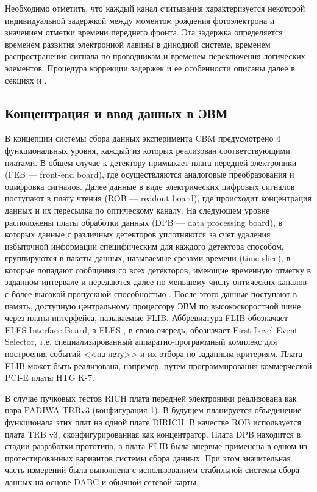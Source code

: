 Необходимо отметить, что каждый канал считывания характеризуется некоторой индивидуальной задержкой между моментом рождения фотоэлектрона и значением отметки времени переднего фронта. Эта задержка определяется временем развития электронной лавины в динодной системе, временем распространения сигнала по проводникам и временем переключения логических элементов. Процедура коррекции задержек и ее особенности описаны далее в секциях \cite{} и \cite{}.

\subsection{Концентрация и ввод данных в ЭВМ}

В концепции системы сбора данных эксперимента CBM предусмотрено 4 функциональных уровня, каждый из которых реализован соответствующими платами. В общем случае к детектору примыкает плата передней электроники (FEB --- front-end board), где осуществляются аналоговые преобразования и оцифровка сигналов. Далее данные в виде электрических цифровых сигналов поступают в плату чтения (ROB --- readout board), где происходит концентрация данных и их пересылка по оптическому каналу. На следующем уровне расположены платы обработки данных (DPB --- data processing board), в которых данные с различных детекторов уплотняются за счет удаления избыточной информации специфическим для каждого детектора способом, группируются в пакеты данных, называемые срезами времени (time slice), в которые попадают сообщения со всех детекторов, имеющие временную отметку в заданном интервале и передаются далее по меньшему числу оптических каналов с более высокой пропускной способностью \cite{}. После этого данные поступают в память, доступную центральному процессору ЭВМ по высокоскоростной шине через платы интерфейса, называемые FLIB. Аббревиатура FLIB обозначает FLES Interface Board, а FLES \cite{}, в свою очередь, обозначает First Level Event Selector, т.е. специализированный аппаратно-программный комплекс для построения событий <<на лету>> и их отбора по заданным критериям. Плата FLIB может быть реализована, например, путем программирования коммерческой  PCI-E платы HTG K-7.

В случае пучковых тестов RICH плата передней электроники реализована как пара PADIWA-TRBv3 (конфигурация 1). В будущем планируется объединение функционала этих плат на одной плате DIRICH. В качестве ROB используется плата TRB v3, сконфигурированная как концентратор. Плата DPB находится в стадии разработки прототипа, а плата FLIB была впервые применена в одном из протестированных вариантов системы сбора данных. При этом значительная часть измерений была выполнена с использованием стабильной системы сбора данных на основе DABC \cite{} и обычной сетевой карты.
